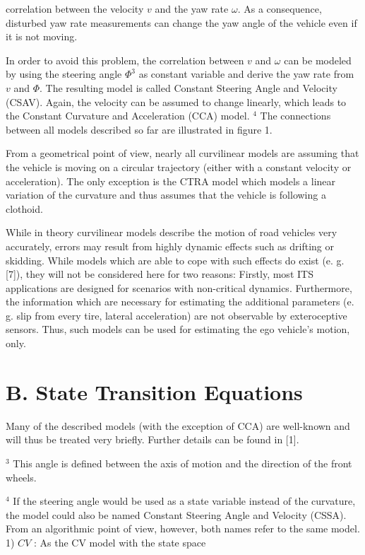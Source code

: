 correlation between the velocity $v$ and the yaw rate $\omega$. As a consequence, disturbed yaw rate measurements can change the yaw angle of the vehicle even if it is not moving.

In order to avoid this problem, the correlation between $v$ and $\omega$ can be modeled by using the steering angle $\Phi^{3}$ as constant variable and derive the yaw rate from $v$ and $\Phi$. The resulting model is called Constant Steering Angle and Velocity (CSAV). Again, the velocity can be assumed to change linearly, which leads to the Constant Curvature and Acceleration (CCA) model. ${ }^{4}$ The connections between all models described so far are illustrated in figure 1.

From a geometrical point of view, nearly all curvilinear models are assuming that the vehicle is moving on a circular trajectory (either with a constant velocity or acceleration). The only exception is the CTRA model which models a linear variation of the curvature and thus assumes that the vehicle is following a clothoid.

While in theory curvilinear models describe the motion of road vehicles very accurately, errors may result from highly dynamic effects such as drifting or skidding. While models which are able to cope with such effects do exist (e. g. [7]), they will not be considered here for two reasons: Firstly, most ITS applications are designed for scenarios with non-critical dynamics. Furthermore, the information which are necessary for estimating the additional parameters (e. g. slip from every tire, lateral acceleration) are not observable by exteroceptive sensors. Thus, such models can be used for estimating the ego vehicle's motion, only.

\section{B. State Transition Equations}
Many of the described models (with the exception of CCA) are well-known and will thus be treated very briefly. Further details can be found in [1].

${ }^{3}$ This angle is defined between the axis of motion and the direction of the front wheels.

${ }^{4}$ If the steering angle would be used as a state variable instead of the curvature, the model could also be named Constant Steering Angle and Velocity (CSSA). From an algorithmic point of view, however, both names refer to the same model. 1) $C V$ : As the CV model with the state space

